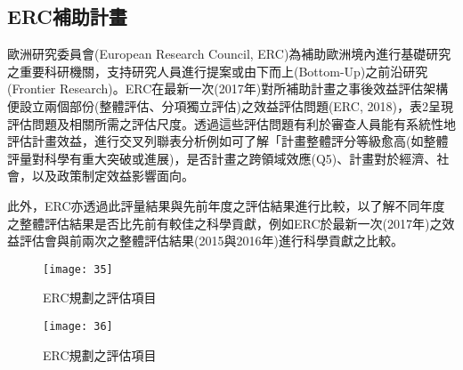 \subsection{ERC補助計畫}
\par
\renewcommand{\baselinestretch}{1} %
\twelve 歐洲研究委員會(European Research Council, ERC)為補助歐洲境內進行基礎研究之重要科研機關，支持研究人員進行提案或由下而上(Bottom-Up)之前沿研究(Frontier Research)。ERC在最新一次(2017年)對所補助計畫之事後效益評估架構便設立兩個部份(整體評估、分項獨立評估)之效益評估問題(ERC, 2018)，表2呈現評估問題及相關所需之評估尺度。透過這些評估問題有利於審查人員能有系統性地評估計畫效益，進行交叉列聯表分析例如可了解「計畫整體評分等級愈高(如整體評量對科學有重大突破或進展)，是否計畫之跨領域效應(Q5)、計畫對於經濟、社會，以及政策制定效益影響面向。
 \par
\renewcommand{\baselinestretch}{1} %
\twelve 此外，ERC亦透過此評量結果與先前年度之評估結果進行比較，以了解不同年度之整體評估結果是否比先前有較佳之科學貢獻，例如ERC於最新一次(2017年)之效益評估會與前兩次之整體評估結果(2015與2016年)進行科學貢獻之比較。
\par
\begin{figure}[hbt!]
\begin{center}
\texttt{[image: 35]}
\caption{\large ERC規劃之評估項目}\label{fig.ERC規劃之評估項目}
\end{center}
\end{figure}
\par
\begin{figure}[hbt!]
\begin{center}
\texttt{[image: 36]}
\caption{\large ERC規劃之評估項目}\label{fig.ERC規劃之評估項目}
\end{center}
\end{figure}
\par

\renewcommand{\baselinestretch}{20} %
